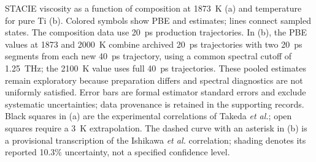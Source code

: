 \caption{STACIE viscosity as a function of composition at 1873~K (a) and temperature for pure Ti (b). Colored symbols show PBE and \rscan{} estimates; lines connect sampled states. The composition data use 20~ps production trajectories. In (b), the PBE values at 1873 and 2000~K combine archived 20~ps trajectories with two 20~ps segments from each new 40~ps trajectory, using a common spectral cutoff of 1.25~THz; the 2100~K value uses full 40~ps trajectories. These pooled estimates remain exploratory because preparation differs and spectral diagnostics are not uniformly satisfied. Error bars are formal estimator standard errors and exclude systematic uncertainties; data provenance is retained in the supporting records. Black squares in (a) are the experimental correlations of Takeda \textit{et al.}\cite{Takeda2025}; open squares require a 3~K extrapolation. The dashed curve with an asterisk in (b) is a provisional transcription of the Ishikawa \textit{et al.}\cite{Ishikawa2012} correlation; shading denotes its reported 10.3\% uncertainty, not a specified confidence level.}
